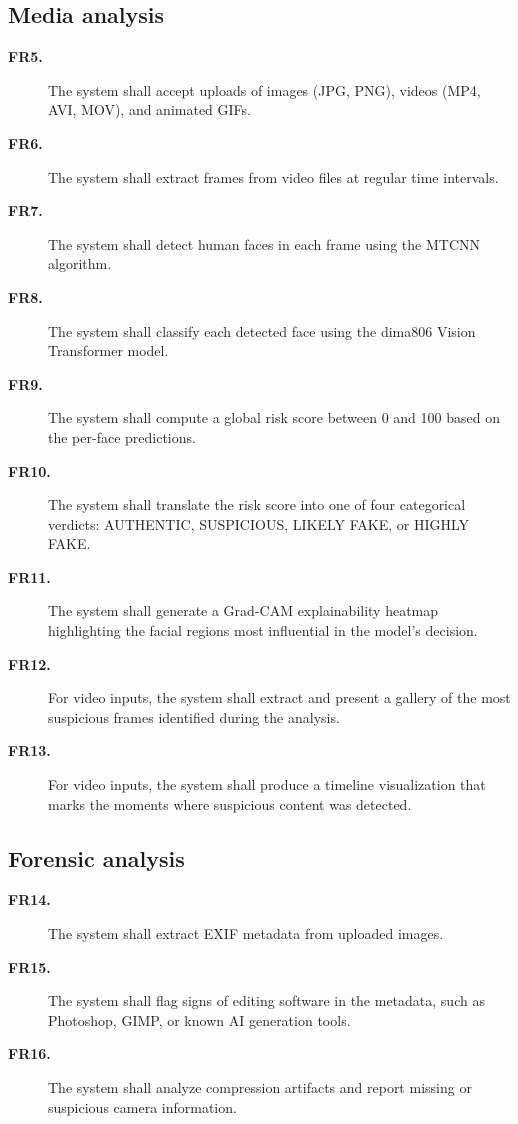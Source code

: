 \subsection*{Media analysis}
\begin{description}
\item[\textbf{FR5.}] The system shall accept uploads of images (JPG, PNG), videos (MP4, AVI, MOV), and animated GIFs.
\item[\textbf{FR6.}] The system shall extract frames from video files at regular time intervals.
\item[\textbf{FR7.}] The system shall detect human faces in each frame using the MTCNN algorithm.
\item[\textbf{FR8.}] The system shall classify each detected face using the dima806 Vision Transformer model.
\item[\textbf{FR9.}] The system shall compute a global risk score between 0 and 100 based on the per-face predictions.
\item[\textbf{FR10.}] The system shall translate the risk score into one of four categorical verdicts: AUTHENTIC, SUSPICIOUS, LIKELY FAKE, or HIGHLY FAKE.
\item[\textbf{FR11.}] The system shall generate a Grad-CAM explainability heatmap highlighting the facial regions most influential in the model's decision.
\item[\textbf{FR12.}] For video inputs, the system shall extract and present a gallery of the most suspicious frames identified during the analysis.
\item[\textbf{FR13.}] For video inputs, the system shall produce a timeline visualization that marks the moments where suspicious content was detected.
\end{description}

\subsection*{Forensic analysis}
\begin{description}
\item[\textbf{FR14.}] The system shall extract EXIF metadata from uploaded images.
\item[\textbf{FR15.}] The system shall flag signs of editing software in the metadata, such as Photoshop, GIMP, or known AI generation tools.
\item[\textbf{FR16.}] The system shall analyze compression artifacts and report missing or suspicious camera information.
\end{description}

